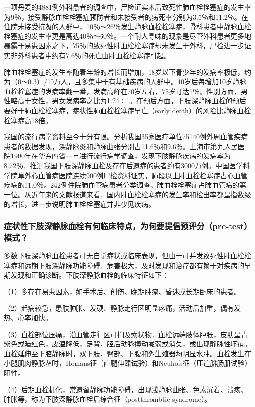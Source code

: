 一项丹麦的4881例外科患者的调查中，尸检证实术后致死性肺血栓栓塞症的发生率为9％，接受静脉血栓栓塞症预防者和未接受者的病死率分别为3.5％和11.2％。在住院未接受抗凝的人群中，10％～26％发生静脉血栓栓塞症，骨科患者中静脉血栓栓塞症的发生率更是高达40％～60％。一个耐人寻味的现象是尽管外科患者更多地暴露于易患因素之下，75％的致死性肺血栓栓塞症却未发生于外科，尸检进一步证实非外科患者中约有7.6％的死亡由肺血栓栓塞症引起。

肺血栓栓塞症的发生率随着年龄的增长而增加，18岁以下青少年的发病率极低，约为（0～0.3）/10万人，且多集中于有基础疾病的人群中。40岁后每增加10岁静脉血栓栓塞症的发病率翻一番，发病高峰在70岁左右，75岁可达1％。性别方面，男性略高于女性，男女发病率之比为1.24∶1。在预后方面，下肢深静脉血栓的预后要好于肺血栓栓塞症，症状性肺血栓栓塞症早亡（early
death）的风险比静脉血栓栓塞症高18倍。

我国的流行病学资料至今十分有限。分析我国35家医疗单位75140例外周血管疾病患者的数据发现，深静脉炎和静脉曲张分别占11.6％和9.6％。上海市第九人民医院1990年在华东四省一市进行流行病学调查，发现下肢静脉疾病的发病率为8.72％，推测我国下肢深静脉血栓及存在后遗症的患者约有3000万例。中国医学科学院阜外心血管病医院连续900例尸检资料证实，肺段以上肺血栓栓塞症占心血管疾病的11.0％。242例住院肺血管病患者分类调查，肺血栓栓塞症占肺血管病的第一位。从近年来的文献报道来看，国内肺血栓栓塞症的发生率和检出率都呈指数级的增长，进一步说明肺血栓栓塞症并非少见疾病。

\subsubsection{症状性下肢深静脉血栓有何临床特点，为何要提倡预评分（pre-test）模式？}

多数下肢深静脉血栓患者可无自觉症状或临床表现，但由于可并发致死性肺血栓栓塞症和远期下肢深静脉功能障碍，危害极大，及时发现和治疗都有赖于对疾病的早期发现和正确诊断。下肢深静脉血栓的临床特征如下：

（1）多存在易患因素，如手术后、创伤、晚期肿瘤、昏迷或长期卧床的患者。

（2）起病较急，患肢肿胀、发硬、静脉走行区明显疼痛，活动后加重，偶有发热、心率加快。

（3）血栓部位压痛，沿血管走行区可扪及索状物，血栓远端肢体肿胀，皮肤呈青紫色或暗红色，皮温降低，足背、胫后动脉搏动减弱或消失，或出现静脉性坏疽。血栓延伸至下腔静脉时，双下肢、臀部、下腹和外生殖器均明显水肿。血栓发生在小腿肌肉静脉丛时，Homans征（直腿伸踝试验）和Neuhofs征（压迫腓肠肌试验）阳性。

（4）后期血栓机化，常遗留静脉功能障碍，出现浅静脉曲张、色素沉着、溃疡、肿胀等，称为下肢深静脉血栓后综合征（postthrombtic
syndrome）。

